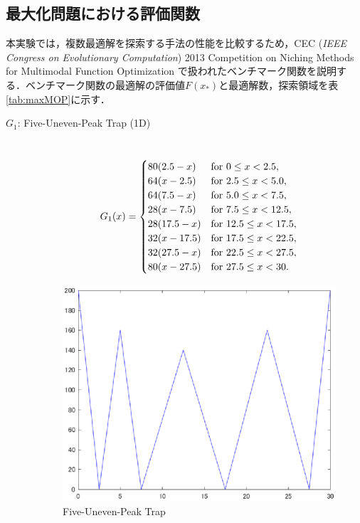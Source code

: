 \documentclass[a4j,11pt]{jarticle}
\begin{document}
\subsection{最大化問題における評価関数}
\label{ss:maxFunc}
本実験では，複数最適解を探索する手法の性能を比較するため，CEC ({\it IEEE Congress on Evolutionary Computation}) 2013 Competition on Niching Methods for Multimodal Function Optimization \cite{CEC2013} で扱われたベンチマーク関数を説明する．ベンチマーク関数の最適解の評価値$F(x_*)$と最適解数，探索領域を表\ref{tab:maxMOP}に示す．
\begin{description}
\item[$G_1$: Five-Uneven-Peak Trap (1D)]\mbox{}\\
\begin{equation}
\label{eq:maxF1}
G_1(x)=\begin{cases}
80(2.5-x) & {\rm for} \ 0 \leq x < 2.5, \\
64(x-2.5) & {\rm for} \ 2.5 \leq x < 5.0, \\
64(7.5-x) & {\rm for} \ 5.0 \leq x < 7.5, \\
28(x-7.5) & {\rm for} \ 7.5 \leq x < 12.5, \\
28(17.5-x) & {\rm for} \ 12.5 \leq x < 17.5, \\
32(x-17.5) & {\rm for} \ 17.5 \leq x < 22.5, \\
32(27.5-x) & {\rm for} \ 22.5 \leq x < 27.5, \\
80(x-27.5) & {\rm for} \ 27.5 \leq x < 30.
\end{cases}
\end{equation}
\begin{figure}[h]
\centering
\includegraphics[width=0.8\linewidth]{eps/F1.eps}
\caption{Five-Uneven-Peak Trap}
\label{fig:maxF1}
\end{figure}


\end{description}
\end{document}

